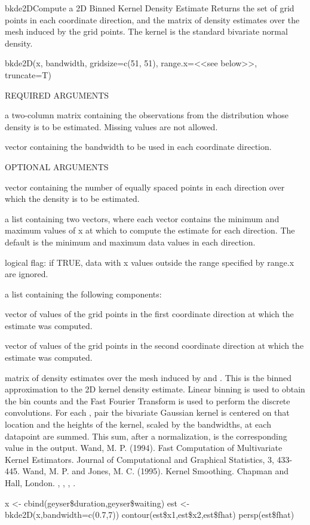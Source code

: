 \begin{Helpfile}{bkde2D}{Compute a 2D Binned Kernel Density Estimate}
Returns the set of grid points in each coordinate direction,
and the matrix of density estimates over the mesh induced by
the grid points. The kernel is the standard bivariate normal
density. 
\begin{Example}
bkde2D(x, bandwidth, gridsize=c(51, 51), range.x=<<see below>>, 
       truncate=T)
\end{Example}
\begin{Argument}{REQUIRED ARGUMENTS}
\item[\Co{x:}]
a two-column matrix containing the observations from the  
distribution whose density is to be estimated.
Missing values are not allowed.
\item[\Co{bandwidth:}]
vector containing the bandwidth to be used in each coordinate
direction.
\end{Argument}
\begin{Argument}{OPTIONAL ARGUMENTS}
\item[\Co{gridsize:}]
vector containing the number of equally spaced points in each direction
over which the density is to be estimated.
\item[\Co{range.x:}]
a list containing two vectors, where each vector 
contains the minimum and maximum values of x
at which to compute the estimate for each direction.
The default is the minimum and maximum data values in each direction.
\item[\Co{truncate:}]
logical flag: if TRUE, data with x values outside the
range specified by range.x are ignored.
\end{Argument}
a list containing the following components:
\item[\Co{x1:}]
vector of values of the grid points in the first coordinate
direction at which the estimate was computed. 
\item[\Co{x2:}]
vector of values of the grid points in the second coordinate
direction at which the estimate was computed. 
\item[\Co{fhat:}]
matrix of density estimates 
over the mesh induced by  and .
This is the binned approximation to the 2D kernel density estimate.
Linear binning is used to obtain the bin counts and the
Fast Fourier Transform is used to perform the discrete convolutions.
For each , pair the bivariate Gaussian kernel is
centered on that location and the heights of the 
kernel, scaled by the bandwidths, at each datapoint are summed.
This sum, after a normalization, is the corresponding 
 value in the output.
Wand, M. P. (1994).
Fast Computation of Multivariate Kernel Estimators.
Journal of Computational and Graphical Statistics,
3, 433-445.
Wand, M. P. and Jones, M. C. (1995).
Kernel Smoothing.
Chapman and Hall, London.
, , , .
\need 15pt
\vspace{-16pt}
\begin{Example}
x <- cbind(geyser\$duration,geyser\$waiting)
est <- bkde2D(x,bandwidth=c(0.7,7))
contour(est\$x1,est\$x2,est\$fhat)
persp(est\$fhat)
\end{Example}
\end{Helpfile}
